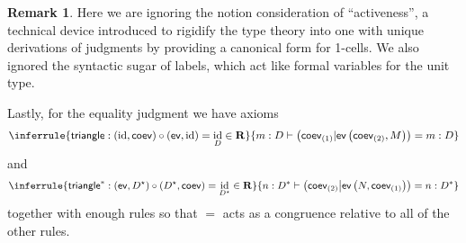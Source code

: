 \documentclass[pra,floatfix,
amsmath,superscriptaddress, 12pt]{article}
\theoremstyle{definition}
\newtheorem*{remark}{Remark}
\newcommand{\evmap}{\mathsf{ev}}
\newcommand{\coev}{\mathsf{coev}}
\newcommand{\msf}[1]{\mathsf{#1}}
\DeclareMathOperator{\id}{{\normalfont\text{id}}}
\begin{document}
\begin{remark} Here we are ignoring the notion consideration of ``activeness'', a technical device introduced to rigidify the type theory into one with unique derivations of judgments by providing a canonical form for 1-cells. We also ignored the syntactic sugar of labels, which act like formal variables for the unit type.
\end{remark}
%
%
Lastly, for the equality judgment we have axioms
%
        \[
            \inferrule{\msf{triangle}: (\id, \coev) \circ (\evmap, \id) = \id_{D}
                            \in
                                \mathbf{R}
                        }{
                            m:D \vdash \left(\coev_{\left(1\right)}|\evmap\left(\coev_{\left(2\right)},M\right)\right) = m:D
                        }
        \]
        and    
        \[
            \inferrule{
                            \mathsf{triangle}^{*}:(\evmap,D^\star)\circ(D^\star,\coev) = \id_{D^\star} \in \mathbf{R}
                        }{
                            n:D^{*}\vdash\left(\coev_{\left(2\right)} \middle| \evmap\left(N,\coev_{\left(1\right)}\right)\right)=n:D^{*}
                        }
        \]
    together with enough rules  so that $=$ acts as a congruence relative to all of the other rules.
\end{document}
